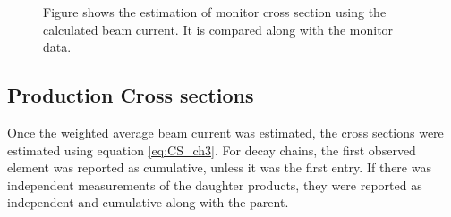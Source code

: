 \documentclass[a4paper,11pt,twoside]{book}
\begin{document}
\begin{figure}
    \quad
    \quad
    \quad
    \quad
    \caption{Figure shows the estimation of monitor cross section using the calculated beam current. It is compared along with the monitor data.  }%
    \label{fig:monitor_BC}%
\end{figure}



\subsection{Production Cross sections}

Once the weighted average beam current was estimated, the cross sections were estimated using equation \ref{eq:CS_ch3}. For decay chains, the first observed element was reported as cumulative, unless it was the first entry. If there was independent measurements of the daughter products, they were reported as independent and cumulative along with the parent. \\
\end{document}
